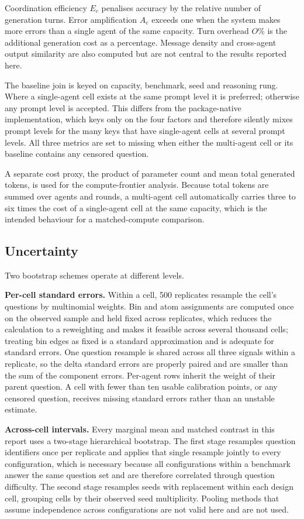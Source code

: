 Coordination efficiency $E_c$ penalises accuracy by the relative number of generation
turns. Error amplification $A_e$ exceeds one when the system makes more errors than a
single agent of the same capacity. Turn overhead $O\%$ is the additional generation cost
as a percentage. Message density and cross-agent output similarity are also computed but
are not central to the results reported here.

The baseline join is keyed on capacity, benchmark, seed and reasoning rung. Where a
single-agent cell exists at the same prompt level it is preferred; otherwise any prompt
level is accepted. This differs from the package-native implementation, which keys only on
the four factors and therefore silently mixes prompt levels for the many keys that have
single-agent cells at several prompt levels. All three metrics are set to missing when
either the multi-agent cell or its baseline contains any censored question.

A separate cost proxy, the product of parameter count and mean total generated tokens, is
used for the compute-frontier analysis. Because total tokens are summed over agents and
rounds, a multi-agent cell automatically carries three to six times the cost of a
single-agent cell at the same capacity, which is the intended behaviour for a
matched-compute comparison.

\subsection{Uncertainty}

Two bootstrap schemes operate at different levels.

\textbf{Per-cell standard errors.} Within a cell, 500 replicates resample the cell's
questions by multinomial weights. Bin and atom assignments are computed once on the
observed sample and held fixed across replicates, which reduces the calculation to a
reweighting and makes it feasible across several thousand cells; treating bin edges as
fixed is a standard approximation and is adequate for standard errors. One question
resample is shared across all three signals within a replicate, so the delta standard
errors are properly paired and are smaller than the sum of the component errors. Per-agent
rows inherit the weight of their parent question. A cell with fewer than ten usable
calibration points, or any censored question, receives missing standard errors rather than
an unstable estimate.

\textbf{Across-cell intervals.} Every marginal mean and matched contrast in this report
uses a two-stage hierarchical bootstrap. The first stage resamples question identifiers
once per replicate and applies that single resample jointly to every configuration, which
is necessary because all configurations within a benchmark answer the same question set
and are therefore correlated through question difficulty. The second stage resamples seeds
with replacement within each design cell, grouping cells by their observed seed
multiplicity. Pooling methods that assume independence across configurations are not valid
here and are not used.

